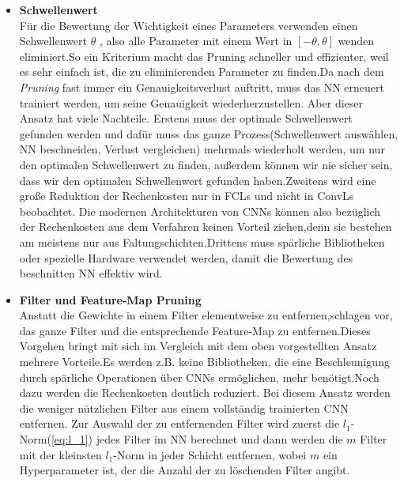 \documentclass[12pt,a4paper]{scrartcl}
\numberwithin{equation}{section}
\begin{document}
\begin{itemize}
		\item \textbf{Schwellenwert}\label{Schwellenwert}\\
			Für die Bewertung der Wichtigkeit eines Parameters verwenden \cite[Han et al]{pruning} einen Schwellenwert $ \theta $ , also alle Parameter mit einem Wert in $ [-\theta, \theta] $ wenden eliminiert.So ein Kriterium macht das Pruning schneller und effizienter, weil es sehr einfach ist, die zu eliminierenden Parameter zu finden.Da nach dem \textit{Pruning} fast immer ein Genauigkeitsverlust auftritt, muss das \ac{NN} erneuert trainiert werden, um seine Genauigkeit wiederherzustellen. Aber dieser Ansatz hat viele Nachteile. Erstens muss der optimale Schwellenwert gefunden werden und dafür muss das ganze Prozess(Schwellenwert auswählen, \ac{NN} beschneiden, Verlust vergleichen) mehrmals wiederholt werden, um nur den optimalen Schwellenwert zu finden, außerdem können wir nie sicher sein, dass wir den optimalen Schwellenwert gefunden haben.Zweitens wird eine  große Reduktion der Rechenkosten nur in \acsp{FCL} und nicht in \acsp{ConvL} beobachtet\cite{Filter Pruning}. Die modernen Architekturen von \acsp{CNN} können also bezüglich der Rechenkosten aus dem Verfahren keinen Vorteil ziehen,denn sie bestehen am meistens nur aus Faltungschichten.Drittens muss spärliche Bibliotheken oder spezielle Hardware verwendet werden, damit die Bewertung des beschnitten \ac{NN} effektiv wird.
	
	\item \textbf{Filter und Feature-Map Pruning}\\
		Anstatt die Gewichte in einem Filter elementweise zu entfernen,schlagen \cite[Li et al]{Filter Pruning} vor, das ganze Filter und die entsprechende Feature-Map zu entfernen.Dieses Vorgehen bringt mit sich im Vergleich mit dem oben vorgestellten Ansatz mehrere Vorteile.Es werden z.B. keine Bibliotheken, die eine Beschleunigung durch spärliche Operationen über \acsp{CNN} ermöglichen, mehr benötigt.Noch dazu werden die Rechenkosten deutlich reduziert. Bei diesem Ansatz werden die weniger nützlichen Filter aus einem vollständig trainierten \ac{CNN}  entfernen. Zur Auswahl der zu entfernenden Filter wird zuerst die $ l_1$-Norm(\ref{eq:l_1}) jedes Filter im \ac{NN} berechnet und dann werden die $ m $ Filter mit der kleinsten $ l_1 $-Norm in jeder Schicht entfernen, wobei $ m $ ein Hyperparameter ist, der die Anzahl der zu löschenden Filter angibt.
		

\end{itemize}
\end{document}
